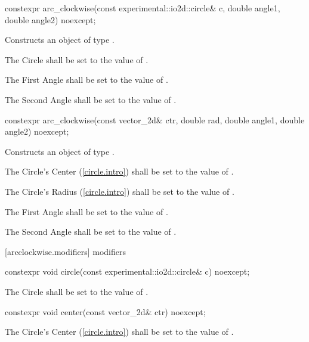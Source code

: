 \begin{itemdecl}
constexpr arc_clockwise(const experimental::io2d::circle& c, double angle1,
  double angle2) noexcept;
\end{itemdecl}
\begin{itemdescr}
\pnum
\effects
Constructs an object of type .

\pnum
The Circle shall be set to the value of .

\pnum
The First Angle shall be set to the value of .

\pnum
The Second Angle shall be set to the value of .
\end{itemdescr}

\begin{itemdecl}
constexpr arc_clockwise(const vector_2d& ctr, double rad, double angle1,
  double angle2) noexcept;
\end{itemdecl}
\begin{itemdescr}
\pnum
\effects
Constructs an object of type .

\pnum
The Circle's Center (\ref{circle.intro}) shall be set to the value of .

\pnum
The Circle's Radius (\ref{circle.intro}) shall be set to the value of .

\pnum
The First Angle shall be set to the value of .

\pnum
The Second Angle shall be set to the value of .
\end{itemdescr}

 [arcclockwise.modifiers]{ modifiers}

\begin{itemdecl}
constexpr void circle(const experimental::io2d::circle& c) noexcept;
\end{itemdecl}
\begin{itemdescr}
\pnum
\effects
The Circle shall be set to the value of .
\end{itemdescr}

\begin{itemdecl}
constexpr void center(const vector_2d& ctr) noexcept;
\end{itemdecl}
\begin{itemdescr}
\pnum
\effects
The Circle's Center (\ref{circle.intro}) shall be set to the value of .
\end{itemdescr}

